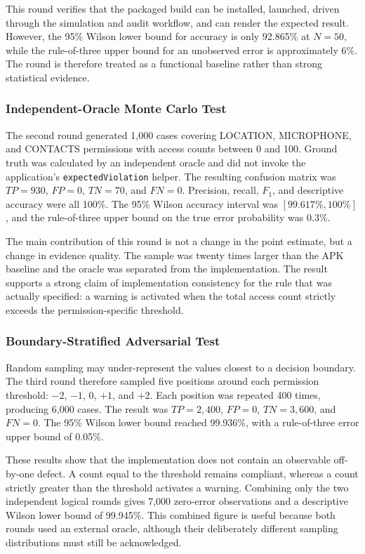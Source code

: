 This round verifies that the packaged build can be installed, launched, driven through the simulation and audit workflow, and can render the expected result. However, the 95\% Wilson lower bound for accuracy is only 92.865\% at \(N=50\), while the rule-of-three upper bound for an unobserved error is approximately 6\%. The round is therefore treated as a functional baseline rather than strong statistical evidence.

\subsubsection{Independent-Oracle Monte Carlo Test}

The second round generated 1,000 cases covering LOCATION, MICROPHONE, and CONTACTS permissions with access counts between 0 and 100. Ground truth was calculated by an independent oracle and did not invoke the application's \texttt{expectedViolation} helper. The resulting confusion matrix was \(TP=930\), \(FP=0\), \(TN=70\), and \(FN=0\). Precision, recall, \(F_1\), and descriptive accuracy were all 100\%. The 95\% Wilson accuracy interval was \([99.617\%,100\%]\), and the rule-of-three upper bound on the true error probability was 0.3\%.

The main contribution of this round is not a change in the point estimate, but a change in evidence quality. The sample was twenty times larger than the APK baseline and the oracle was separated from the implementation. The result supports a strong claim of implementation consistency for the rule that was actually specified: a warning is activated when the total access count strictly exceeds the permission-specific threshold.

\subsubsection{Boundary-Stratified Adversarial Test}

Random sampling may under-represent the values closest to a decision boundary. The third round therefore sampled five positions around each permission threshold: \(-2\), \(-1\), \(0\), \(+1\), and \(+2\). Each position was repeated 400 times, producing 6,000 cases. The result was \(TP=2,400\), \(FP=0\), \(TN=3,600\), and \(FN=0\). The 95\% Wilson lower bound reached 99.936\%, with a rule-of-three error upper bound of 0.05\%.

These results show that the implementation does not contain an observable off-by-one defect. A count equal to the threshold remains compliant, whereas a count strictly greater than the threshold activates a warning. Combining only the two independent logical rounds gives 7,000 zero-error observations and a descriptive Wilson lower bound of 99.945\%. This combined figure is useful because both rounds used an external oracle, although their deliberately different sampling distributions must still be acknowledged.

